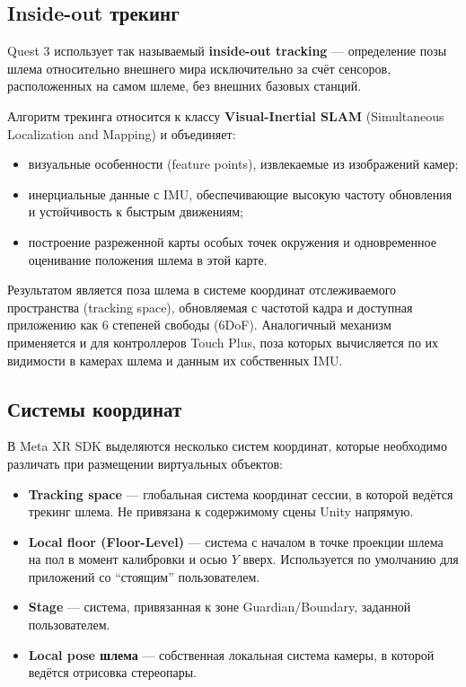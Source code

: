 \documentclass[a4paper,12pt]{article}
\begin{document}
\subsection*{Inside-out трекинг}

Quest 3 использует так называемый \textbf{inside-out tracking} --- определение позы шлема относительно внешнего мира исключительно за счёт сенсоров, расположенных на самом шлеме, без внешних базовых станций.

Алгоритм трекинга относится к классу \textbf{Visual-Inertial SLAM} (Simultaneous Localization and Mapping) и объединяет:

\begin{itemize}
    \item визуальные особенности (feature points), извлекаемые из изображений камер;
    \item инерциальные данные с IMU, обеспечивающие высокую частоту обновления и устойчивость к быстрым движениям;
    \item построение разреженной карты особых точек окружения и одновременное оценивание положения шлема в этой карте.
\end{itemize}

Результатом является поза шлема в системе координат отслеживаемого пространства (tracking space), обновляемая с частотой кадра и доступная приложению как 6 степеней свободы (6DoF). Аналогичный механизм применяется и для контроллеров Touch Plus, поза которых вычисляется по их видимости в камерах шлема и данным их собственных IMU.

\subsection*{Системы координат}

В Meta XR SDK выделяются несколько систем координат, которые необходимо различать при размещении виртуальных объектов:

\begin{itemize}
    \item \textbf{Tracking space} --- глобальная система координат сессии, в которой ведётся трекинг шлема. Не привязана к содержимому сцены Unity напрямую.
    \item \textbf{Local floor (Floor-Level)} --- система с началом в точке проекции шлема на пол в момент калибровки и осью $Y$ вверх. Используется по умолчанию для приложений со ``стоящим'' пользователем.
    \item \textbf{Stage} --- система, привязанная к зоне Guardian/Boundary, заданной пользователем.
    \item \textbf{Local pose шлема} --- собственная локальная система камеры, в которой ведётся отрисовка стереопары.
\end{itemize}
\end{document}
